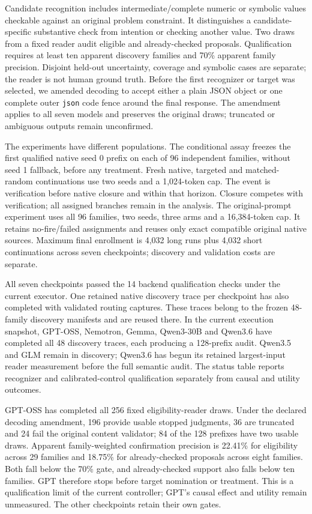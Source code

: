 Candidate recognition includes intermediate/complete numeric or symbolic
values checkable against an original problem constraint. It distinguishes
a candidate-specific substantive check from intention or checking another
value. Two draws from a fixed reader audit eligible and already-checked
proposals. Qualification requires at least ten apparent discovery families
and 70\% apparent family precision. Disjoint held-out uncertainty, coverage
and symbolic cases are separate; the reader is not human ground truth.
Before the first recognizer or target was selected, we amended decoding
to accept either a plain JSON object or one complete outer \texttt{json}
code fence around the final response. The amendment applies to all seven
models and preserves the original draws; truncated or ambiguous outputs
remain unconfirmed.

The experiments have different populations. The conditional assay freezes
the first qualified native seed 0 prefix on each of 96 independent families,
without seed 1 fallback, before any treatment. Fresh native, targeted and
matched-random continuations use two seeds and a 1,024-token cap. The event
is verification before native closure and within that horizon. Closure
competes with verification; all assigned branches remain in the analysis.
The original-prompt experiment uses all 96 families, two seeds, three arms
and a 16,384-token cap. It retains no-fire/failed assignments and reuses only
exact compatible original native sources. Maximum final enrollment is
4,032 long runs plus 4,032 short continuations across seven checkpoints;
discovery and validation costs are separate.



All seven checkpoints passed the 14 backend qualification checks under
the current executor. One retained native discovery trace per checkpoint
has also completed with validated routing captures. These traces belong
to the frozen 48-family discovery manifests and are reused there.
In the current execution snapshot, GPT-OSS, Nemotron, Gemma, Qwen3-30B and Qwen3.6
have completed all 48 discovery traces, each producing a 128-prefix audit.
Qwen3.5 and GLM remain in discovery; Qwen3.6 has begun its retained
largest-input reader measurement before the full semantic audit.
The status table reports recognizer and calibrated-control qualification
separately from causal and utility outcomes.

GPT-OSS has completed all 256 fixed eligibility-reader draws. Under the
declared decoding amendment, 196 provide usable stopped judgments, 36 are
truncated and 24 fail the original content validator; 84 of the 128
prefixes have two usable draws. Apparent family-weighted confirmation
precision is 22.41\% for eligibility across 29 families and 18.75\% for
already-checked proposals across eight families. Both fall below the
70\% gate, and already-checked support also falls below ten families.
GPT therefore stops before target nomination or treatment. This is a
qualification limit of the current controller; GPT's causal effect and
utility remain unmeasured. The other checkpoints retain their own gates.


